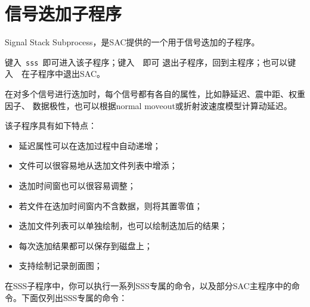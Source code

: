 \section{信号迭加子程序}

Signal Stack Subprocess，是SAC提供的一个用于信号迭加的子程序。

键入~\verb+sss+~即可进入该子程序；键入~~即可
退出子程序，回到主程序；也可以键入~~在子程序中退出SAC。

在对多个信号进行迭加时，每个信号都有各自的属性，比如静延迟、震中距、权重因子、
数据极性，也可以根据normal moveout或折射波速度模型计算动延迟。

该子程序具有如下特点：
\begin{itemize}
\item 延迟属性可以在迭加过程中自动递增；
\item 文件可以很容易地从迭加文件列表中增添；
\item 迭加时间窗也可以很容易调整；
\item 若文件在迭加时间窗内不含数据，则将其置零值；
\item 迭加文件列表可以单独绘制，也可以绘制迭加后的结果；
\item 每次迭加结果都可以保存到磁盘上；
\item 支持绘制记录剖面图；
\end{itemize}

在SSS子程序中，你可以执行一系列SSS专属的命令，以及部分SAC主程序中的命令。下面仅列出SSS专属的命令：

